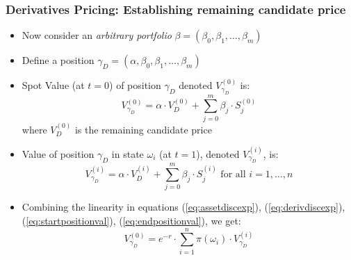 \documentclass{beamer}
\begin{document}
\begin{frame}
\frametitle{Derivatives Pricing: Establishing remaining candidate price}
\begin{itemize}
\item Now consider an {\em arbitrary portfolio} $\beta = (\beta_0, \beta_1, \ldots, \beta_m)$
\item Define a position $\gamma_D = (\alpha, \beta_0, \beta_1, \ldots, \beta_m)$
\item Spot Value (at $t=0$) of position $\gamma_D$ denoted $V_{\gamma_D}^{(0)}$ is:
\begin{equation}
V_{\gamma_D}^{(0)} = \alpha \cdot V_D^{(0)} + \sum_{j=0}^m \beta_j \cdot S_j^{(0)} \label{eq:startpositionval}
\end{equation}
where $V_D^{(0)}$ is the remaining candidate price
\item Value of position $\gamma_D$ in state $\omega_i$ (at $t=1$), denoted $V_{\gamma_D}^{(i)}$, is:
\begin{equation}
V_{\gamma_D}^{(i)} = \alpha \cdot V_D^{(i)} + \sum_{j=0}^m \beta_j \cdot S_j^{(i)} \mbox{ for all } i = 1, \ldots, n \label{eq:endpositionval}
\end{equation}
\item Combining the linearity in equations (\ref{eq:assetdiscexp}), (\ref{eq:derivdiscexp}), (\ref{eq:startpositionval}), (\ref{eq:endpositionval}), we get:
\begin{equation}
V_{\gamma_D}^{(0)} = e^{-r} \cdot \sum_{i=1}^n \pi(\omega_i) \cdot V_{\gamma_D}^{(i)} \label{eq:positiondiscexp}
\end{equation}
\end{itemize}
\end{frame}
\end{document}
